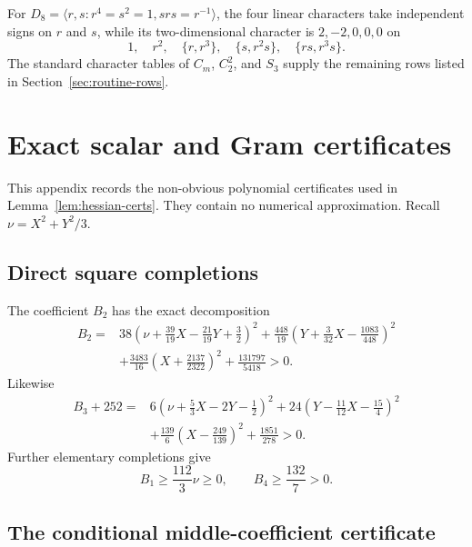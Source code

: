 \documentclass[11pt]{article}
\theoremstyle{definition}
\begin{document}
For $D_8=\langle r,s:r^4=s^2=1,srs=r^{-1}\rangle$, the four linear
characters take independent signs on $r$ and $s$, while its two-dimensional
character is $2,-2,0,0,0$ on
\[
 1,\quad r^2,\quad\{r,r^3\},\quad\{s,r^2s\},\quad\{rs,r^3s\}.
\]
The standard character tables of $C_m$, $C_2^2$, and $S_3$ supply the
remaining rows listed in Section~\ref{sec:routine-rows}.

\section{Exact scalar and Gram certificates}\label{app:sos}

This appendix records the non-obvious polynomial certificates used in
Lemma~\ref{lem:hessian-certs}.  They contain no numerical approximation.
Recall $\nu=X^2+Y^2/3$.

\subsection{Direct square completions}

The coefficient $B_2$ has the exact decomposition
\begin{align*}
 B_2={}&38\left(\nu+\frac{39}{19}X-\frac{21}{19}Y+\frac32\right)^2
 +\frac{448}{19}\left(Y+\frac3{32}X-\frac{1083}{448}\right)^2\\
 &+\frac{3483}{16}\left(X+\frac{2137}{2322}\right)^2
 +\frac{131797}{5418}>0.
\end{align*}
Likewise
\begin{align*}
 B_3+252={}&6\left(\nu+\frac53X-2Y-\frac12\right)^2
 +24\left(Y-\frac{11}{12}X-\frac{15}{4}\right)^2\\
 &+\frac{139}{6}\left(X-\frac{249}{139}\right)^2
 +\frac{1851}{278}>0.
\end{align*}
Further elementary completions give
\[
 B_1\geq\frac{112}{3}\nu\geq0,\qquad
 B_4\geq\frac{132}{7}>0.
\]

\subsection{The conditional middle-coefficient certificate}
\end{document}
